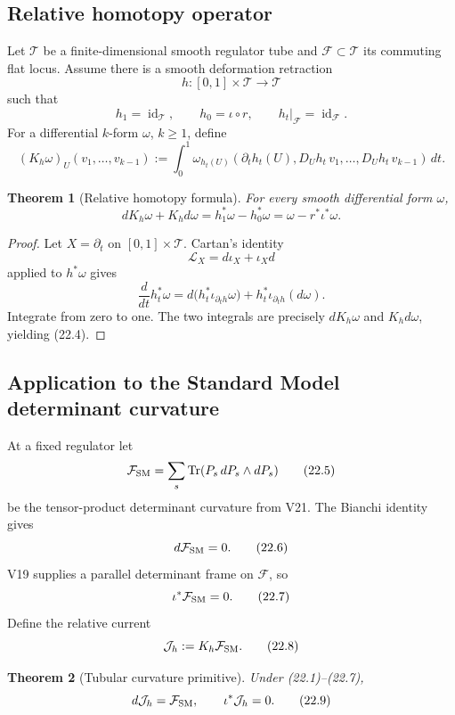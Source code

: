 \documentclass[11pt]{article}
\newtheorem{theorem}{Theorem}[section]
\newcommand{\Tr}{\operatorname{Tr}}
\begin{document}
\subsection{Relative homotopy operator}

Let \(\mathcal T\) be a finite-dimensional smooth regulator tube and
\(\mathcal F\subset\mathcal T\) its commuting flat locus.  Assume there is
a smooth deformation retraction
\[
 h:[0,1]\times\mathcal T\longrightarrow\mathcal T
 \tag{22.1}
\]
such that
\[
 h_1=\operatorname{id}_{\mathcal T},\qquad
 h_0=\iota\circ r,\qquad
 h_t|_{\mathcal F}=\operatorname{id}_{\mathcal F}.
 \tag{22.2}
\]
For a differential \(k\)-form \(\omega\), \(k\geq1\), define
\[
 (K_h\omega)_U(v_1,\ldots,v_{k-1})
 :=
 \int_0^1
 \omega_{h_t(U)}
 \left(
 \partial_th_t(U),
 D_Uh_t\,v_1,\ldots,D_Uh_t\,v_{k-1}
 \right)\,dt.
 \tag{22.3}
\]

\begin{theorem}[Relative homotopy formula]
\label{thm:v11v22-homotopy}
For every smooth differential form \(\omega\),
\[
 dK_h\omega+K_hd\omega
 =
 h_1^*\omega-h_0^*\omega
 =
 \omega-r^*\iota^*\omega.
 \tag{22.4}
\]
\end{theorem}

\begin{proof}
Let \(X=\partial_t\) on \([0,1]\times\mathcal T\).  Cartan's identity
\[
 \mathcal L_X=d\iota_X+\iota_Xd
\]
applied to \(h^*\omega\) gives
\[
 \frac{d}{dt}h_t^*\omega
 =
 d\bigl(h_t^*\iota_{\partial_t h}\omega\bigr)
 +
 h_t^*\iota_{\partial_t h}(d\omega).
\]
Integrate from zero to one.  The two integrals are precisely
\(dK_h\omega\) and \(K_hd\omega\), yielding (22.4).
\end{proof}

\subsection{Application to the Standard Model determinant curvature}

At a fixed regulator let
\[
 \mathcal F_{\rm SM}
 =
 \sum_s\Tr(P_s\,dP_s\wedge dP_s)
 \tag{22.5}
\]
be the tensor-product determinant curvature from V21.  The Bianchi
identity gives
\[
 d\mathcal F_{\rm SM}=0.
 \tag{22.6}
\]
V19 supplies a parallel determinant frame on \(\mathcal F\), so
\[
 \iota^*\mathcal F_{\rm SM}=0.
 \tag{22.7}
\]
Define the relative current
\[
 \mathcal J_h:=K_h\mathcal F_{\rm SM}.
 \tag{22.8}
\]

\begin{theorem}[Tubular curvature primitive]
\label{thm:v11v22-primitive}
Under (22.1)--(22.7),
\[
 d\mathcal J_h=\mathcal F_{\rm SM},
 \qquad
 \iota^*\mathcal J_h=0.
 \tag{22.9}
\]
\end{theorem}
\end{document}
